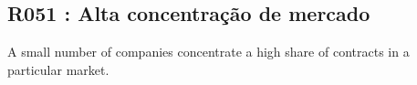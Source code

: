 %

\subsection{R051 : Alta concentração de mercado}

{A small number of companies concentrate a high share of contracts in a particular market.}



